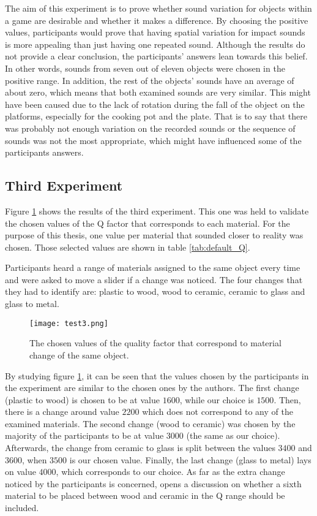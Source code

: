 The aim of this experiment is to prove whether sound variation for objects within a game are desirable and whether it makes a difference. By choosing the positive values, participants would prove that having spatial variation for impact sounds is more appealing than just having one repeated sound. Although the results do not provide a clear conclusion, the participants' answers lean towards this belief. In other words, sounds from seven out of eleven objects were chosen in the positive range. In addition, the rest of the objects' sounds have an average of about zero, which means that both examined sounds are very similar. This might have been caused due to the lack of rotation during the fall of the object on the platforms, especially for the cooking pot and the plate. That is to say that there was probably not enough variation on the recorded sounds or the sequence of sounds was not the most appropriate, which might have influenced some of the participants answers.

\subsection{Third Experiment}

Figure \ref{fig:test3} shows the results of the third experiment. This one was held to validate the chosen values of the \gls{Q} factor that corresponds to each material. For the purpose of this thesis, one value per material that sounded closer to reality was chosen. Those selected values are shown in table \ref{tab:default_Q}.  

Participants heard a range of materials assigned to the same object every time and were asked to move a slider if a change was noticed. The four changes that they had to identify are: plastic to wood, wood to ceramic, ceramic to glass and glass to metal.

\begin{figure}[H]
  \centering
    \texttt{[image: test3.png]}
      \caption{The chosen values of the quality factor that correspond to material change of the same object.}\label{fig:test3}
\end{figure}

By studying figure \ref{fig:test3}, it can be seen that the values chosen by the participants in the experiment are similar to the chosen ones by the authors. The first change (plastic to wood) is chosen to be at value $1600$, while our choice is $1500$. Then, there is a change around value $2200$ which does not correspond to any of the examined materials. The second change (wood to ceramic) was chosen by the majority of the participants to be at value $3000$ (the same as our choice). Afterwards, the change from ceramic to glass is split between the values $3400$ and $3600$, when $3500$ is our chosen value. Finally, the last change (glass to metal) lays on value $4000$, which corresponds to our choice. As far as the extra change noticed by the participants is concerned, opens a discussion on whether a sixth material to be placed between wood and ceramic in the \gls{Q} range should be included.

